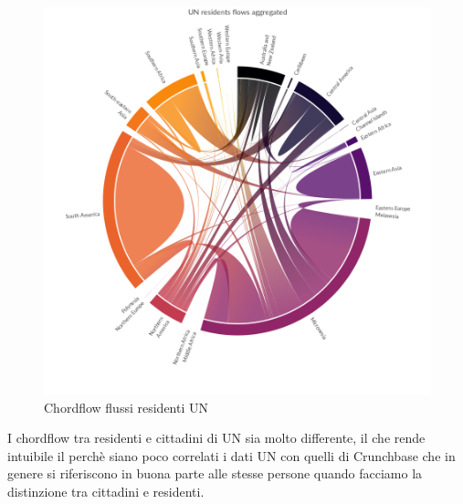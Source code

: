 \begin{figure}[t]
    \centering
    \includegraphics[width=1.0\textwidth]{images/ChordFlows/UN_res_True.png}
    \caption{Chordflow flussi residenti UN}
    \label{fig:chordunrestrue}
\end{figure}
I chordflow tra residenti e cittadini di UN sia molto differente, il che rende intuibile il perchè siano poco correlati i dati UN con quelli di Crunchbase che in genere si riferiscono in buona parte alle stesse persone quando facciamo la distinzione tra cittadini e residenti. 


